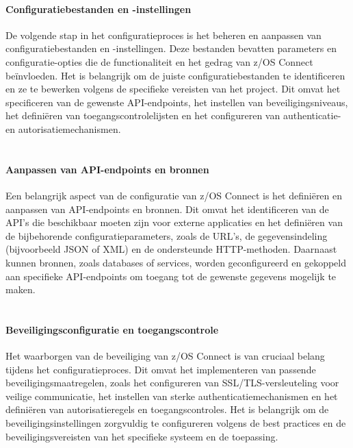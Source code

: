 \paragraph{Configuratiebestanden en -instellingen}
De volgende stap in het configuratieproces is het beheren en aanpassen van configuratiebestanden en -instellingen. Deze bestanden bevatten parameters en configuratie-opties die de functionaliteit en het gedrag van z/OS Connect beïnvloeden. Het is belangrijk om de juiste configuratiebestanden te identificeren en ze te bewerken volgens de specifieke vereisten van het project. Dit omvat het specificeren van de gewenste API-endpoints, het instellen van beveiligingsniveaus, het definiëren van toegangscontrolelijsten en het configureren van authenticatie- en autorisatiemechanismen.  \autocite{IBM2023c}
\\ \\
\paragraph{Aanpassen van API-endpoints en bronnen}
Een belangrijk aspect van de configuratie van z/OS Connect is het definiëren en aanpassen van API-endpoints en bronnen. Dit omvat het identificeren van de API's die beschikbaar moeten zijn voor externe applicaties en het definiëren van de bijbehorende configuratieparameters, zoals de URL's, de gegevensindeling (bijvoorbeeld JSON of XML) en de ondersteunde HTTP-methoden. Daarnaast kunnen bronnen, zoals databases of services, worden geconfigureerd en gekoppeld aan specifieke API-endpoints om toegang tot de gewenste gegevens mogelijk te maken.  \autocite{IBM2023c}
\\ \\
\paragraph{Beveiligingsconfiguratie en toegangscontrole}
Het waarborgen van de beveiliging van z/OS Connect is van cruciaal belang tijdens het configuratieproces. Dit omvat het implementeren van passende beveiligingsmaatregelen, zoals het configureren van SSL/TLS-versleuteling voor veilige communicatie, het instellen van sterke authenticatiemechanismen en het definiëren van autorisatieregels en toegangscontroles. Het is belangrijk om de beveiligingsinstellingen zorgvuldig te configureren volgens de best practices en de beveiligingsvereisten van het specifieke systeem en de toepassing.  \autocite{IBM2023c}
\\ \\
